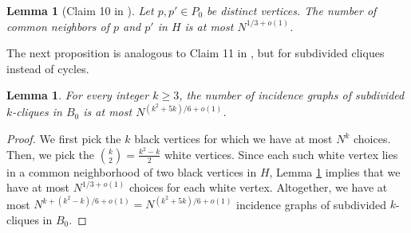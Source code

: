 \documentclass{article}
\newtheorem{lemma}[theorem]{Lemma}
\begin{document}
\begin{lemma}[Claim 10 in \cite{tomSuk21}]
\label{lem-common}
Let $p,p'\in P_0$ be distinct vertices. The number of common neighbors of $p$ and $p'$ in $H$ is at most $N^{1/3+o(1)}$.
\end{lemma}

The next proposition is analogous to Claim 11 in \cite{tomSuk21}, but for subdivided cliques instead of cycles.

\begin{lemma}
\label{lem-copies}
For every integer $k\geq 3$, the number of incidence graphs of subdivided $k$-cliques in $B_0$ is at most $N^{(k^2+5k)/6+o(1)}$.
\end{lemma}

\begin{proof}
We first pick the $k$ black vertices for which we have at most $N^k$ choices.
Then, we pick the $\binom{k}{2} = \frac{k^2-k}{2}$ white vertices.
Since each such white vertex lies in a common neighborhood of two black vertices in $H$, Lemma \ref{lem-common} implies that we have at most $N^{1/3+o(1)}$ choices for each white vertex.
Altogether, we have at most $N^{k+(k^2-k)/6+o(1)} = N^{(k^2+5k)/6+o(1)}$ incidence graphs of subdivided $k$-cliques in $B_0$.
\end{proof}
\end{document}
